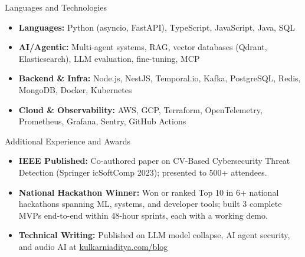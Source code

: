 \documentclass[]{mcdowellcv}
\begin{document}
\begin{cvsection}{Languages and Technologies}
  \begin{cvsubsection}{}{}{}
    \begin{itemize}
      \item \textbf{Languages:} Python (asyncio, FastAPI), TypeScript, JavaScript, Java, SQL
      \item \textbf{AI/Agentic:} Multi-agent systems, RAG, vector databases (Qdrant, Elasticsearch), LLM evaluation, fine-tuning, MCP
      \item \textbf{Backend \& Infra:} Node.js, NestJS, Temporal.io, Kafka, PostgreSQL, Redis, MongoDB, Docker, Kubernetes
      \item \textbf{Cloud \& Observability:} AWS, GCP, Terraform, OpenTelemetry, Prometheus, Grafana, Sentry, GitHub Actions
    \end{itemize}
  \end{cvsubsection}
\end{cvsection}

\begin{cvsection}{Additional Experience and Awards}
  \begin{cvsubsection}{}{}{}
    \begin{itemize}
      \item \textbf{IEEE Published:} Co-authored paper on CV-Based Cybersecurity Threat Detection (Springer icSoftComp 2023); presented to 500+ attendees.
      \item \textbf{National Hackathon Winner:} Won or ranked Top 10 in 6+ national hackathons spanning ML, systems, and developer tools; built 3 complete MVPs end-to-end within 48-hour sprints, each with a working demo.
      \item \textbf{Technical Writing:} Published on LLM model collapse, AI agent security, and audio AI at \href{https://www.kulkarniaditya.com/blog}{kulkarniaditya.com/blog}
    \end{itemize}
  \end{cvsubsection}
\end{cvsection}
\end{document}
